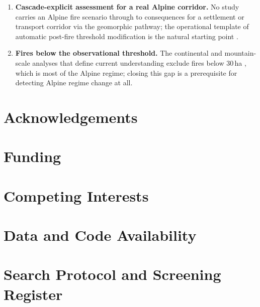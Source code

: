\documentclass[11pt,a4paper]{article}
\begin{document}
\begin{enumerate}
    \item \textbf{Cascade-explicit assessment for a real Alpine corridor.} No study carries an Alpine fire scenario through to consequences for a settlement or transport corridor via the geomorphic pathway; the operational template of automatic post-fire threshold modification is the natural starting point \citep{tiranti_wildfires_2021}.
    \item \textbf{Fires below the observational threshold.} The continental and mountain-scale analyses that define current understanding exclude fires below 30\,ha \citep{beloiu_climatedriven_2026}, which is most of the Alpine regime; closing this gap is a prerequisite for detecting Alpine regime change at all.
\end{enumerate}


\section*{Acknowledgements}

\section*{Funding}

\section*{Competing Interests}

\section*{Data and Code Availability}


\appendix

\section{Search Protocol and Screening Register}
\label{app:prisma}
\end{document}
